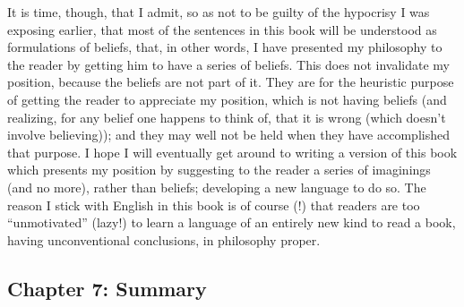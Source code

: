It is time, though, that I admit, so as not to be guilty of the hypocrisy I was exposing earlier, that most of the sentences in this book will be understood as formulations of beliefs, that, in other words, I have presented my philosophy to the reader by getting him to have a series of beliefs. This does not invalidate my position, because the beliefs are not part of it. They are for the heuristic purpose of getting the reader to appreciate my position, which is not having beliefs (and realizing, for any belief one happens to think of, that it is wrong (which doesn't involve believing)); and they may well not be held when they have accomplished that purpose. I hope I will eventually get around to writing a version of this book which presents my position by suggesting to the reader a series of imaginings (and no more), rather than beliefs; developing a new language to do so. The reason I stick with English in this book is of course (!) that readers are too \enquote{unmotivated} (lazy!) to learn a language of an entirely new kind to read a book, having unconventional conclusions, in philosophy proper. 

\subsection[Chapter 7: Summary][Summary]{Chapter 7: Summary}

